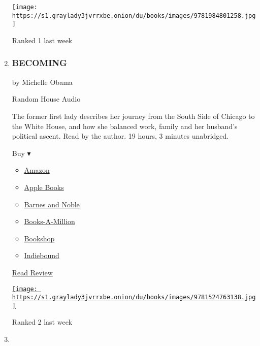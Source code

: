 \begin{enumerate}
  \texttt{[image: https://s1.graylady3jvrrxbe.onion/du/books/images/9781984801258.jpg]}

  Ranked 1 last week
\item
  \href{https://www.nytimes3xbfgragh.onion/2018/12/06/books/review/michelle-obama-becoming-memoir.html}{}

  \hypertarget{becoming}{%
  \subsubsection{BECOMING}\label{becoming}}

  by Michelle Obama

  Random House Audio

  The former first lady describes her journey from the South Side of
  Chicago to the White House, and how she balanced work, family and her
  husband's political ascent. Read by the author. 19 hours, 3 minutes
  unabridged.

  Buy ▾

  \begin{itemize}
  \tightlist
  \item
    \href{https://www.amazon.com/Becoming-Michelle-Obama/dp/1524763136?tag=NYTBS-20}{Amazon}
  \item
    \href{https://du-gae-books-dot-nyt-du-prd.appspot.com/buy?title=BECOMING\&author=Michelle+Obama}{Apple
    Books}
  \item
    \href{https://www.anrdoezrs.net/click-7990613-11819508?url=https\%3A\%2F\%2Fwww.barnesandnoble.com\%2Fw\%2F\%3Fean\%3D9780525633686}{Barnes
    and Noble}
  \item
    \href{https://www.anrdoezrs.net/click-7990613-35140?url=https\%3A\%2F\%2Fwww.booksamillion.com\%2Fp\%2FBECOMING\%2FMichelle\%2BObama\%2F9780525633686}{Books-A-Million}
  \item
    \href{https://bookshop.org/a/3546/9780525633686}{Bookshop}
  \item
    \href{https://www.indiebound.org/book/9780525633686?aff=NYT}{Indiebound}
  \end{itemize}

  \href{https://www.nytimes3xbfgragh.onion/2018/12/06/books/review/michelle-obama-becoming-memoir.html}{Read
  Review}

  \href{https://www.nytimes3xbfgragh.onion/2018/12/06/books/review/michelle-obama-becoming-memoir.html}{\texttt{[image: https://s1.graylady3jvrrxbe.onion/du/books/images/9781524763138.jpg]}}

  Ranked 2 last week
\item
  \hypertarget{im-still-here}{%
}
\end{enumerate}
